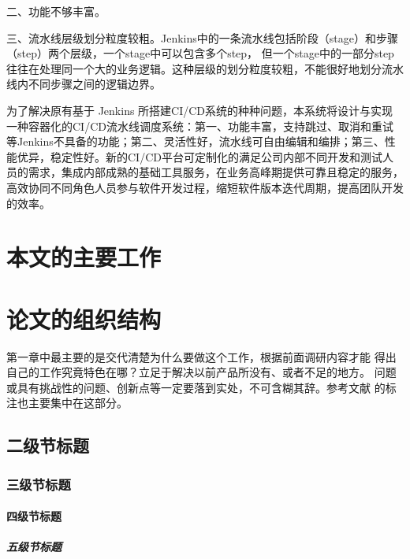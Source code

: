 二、功能不够丰富。

三、流水线层级划分粒度较粗。Jenkins中的一条流水线包括阶段（stage）和步骤（step）两个层级，一个stage中可以包含多个step，
但一个stage中的一部分step往往在处理同一个大的业务逻辑。这种层级的划分粒度较粗，不能很好地划分流水线内不同步骤之间的逻辑边界。

为了解决原有基于 Jenkins 所搭建CI/CD系统的种种问题，本系统将设计与实现一种容器化的CI/CD流水线调度系统：第一、功能丰富，支持跳过、取消和重试等Jenkins不具备的功能；第二、灵活性好，流水线可自由编辑和编排；第三、性能优异，稳定性好。新的CI/CD平台可定制化的满足公司内部不同开发和测试人员的需求，集成内部成熟的基础工具服务，在业务高峰期提供可靠且稳定的服务，高效协同不同角色人员参与软件开发过程，缩短软件版本迭代周期，提高团队开发的效率。


\section{本文的主要工作}

\section{论文的组织结构}
第一章中最主要的是交代清楚为什么要做这个工作，根据前面调研内容才能
得出自己的工作究竟特色在哪？立足于解决以前产品所没有、或者不足的地方。
问题或具有挑战性的问题、创新点等一定要落到实处，不可含糊其辞。参考文献
的标注也主要集中在这部分。


\subsection{二级节标题}

\subsubsection{三级节标题}

\paragraph{四级节标题}

\subparagraph{五级节标题}
